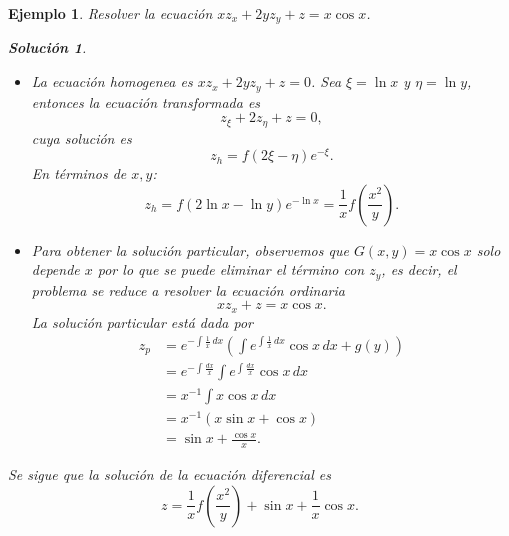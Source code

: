 \documentclass[11pt,letterpaper]{report}
\newtheorem{example}[defn]{Ejemplo}
\newtheorem*{sol}{Solución}
\newcommand\<{\langle}
\renewcommand\>{\rangle}
\begin{document}
\begin{example}
  Resolver la ecuación $x z_x + 2y z_y + z = x\cos x$.
  \begin{sol}
    \begin{itemize}
      \item La ecuación homogenea es $xz_x+2yz_y + z=0$. Sea
        $\xi = \ln x$ y $\eta = \ln y$, entonces la ecuación
        transformada es
        \[
          z_\xi + 2z_\eta + z = 0,
        \] 
        cuya solución es
        \[
          z_h = f(2\xi - \eta)e^{-\xi}.
        \] 
        En términos de $x,y$:
        \[
        z_h = f(2\ln x - \ln y)e^{-\ln x} = \frac{1}{x}
        f\left(\frac{x^2}{y}\right).
        \] 
      \item Para obtener la solución particular, observemos
        que $G(x,y) = x \cos x$ solo depende $x$ por lo que
        se puede eliminar el término con $z_y$, es decir, el
        problema se reduce a resolver la ecuación ordinaria
        \[
        x z_x + z = x\cos x.
        \] 
        La solución particular está dada por
        \begin{align*}
          z_p &= e^{-\int \frac{1}{x}\, dx} \left(\int
            e^{\int \frac{1}{x} \, dx} \cos x \, dx +
            g(y)\right)\\
              &= e^{-\int \frac{dx}{x}} \int e^{\int
              \frac{dx}{x}} \cos x \, dx\\
              &= x^{-1} \int x\cos x \, dx\\
              &= x^{-1}\left(x\sin x + \cos x\right)\\
              &= \sin x + \frac{\cos x}{x}.
        \end{align*}
    \end{itemize}
    Se sigue que la solución de la ecuación diferencial es
    \[
    z = \frac{1}{x}f\left(\frac{x^2}{y}\right) + \sin x +
      \frac{1}{x} \cos x.
    \] 
  \end{sol}
\end{example}
\end{document}
